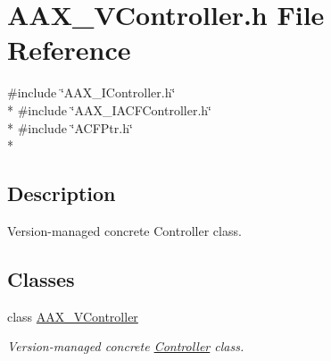 \hypertarget{a00304}{}\section{A\+A\+X\+\_\+\+V\+Controller.\+h File Reference}
\label{a00304}
{\ttfamily \#include \char`\"{}A\+A\+X\+\_\+\+I\+Controller.\+h\char`\"{}}\\*
{\ttfamily \#include \char`\"{}A\+A\+X\+\_\+\+I\+A\+C\+F\+Controller.\+h\char`\"{}}\\*
{\ttfamily \#include \char`\"{}A\+C\+F\+Ptr.\+h\char`\"{}}\\*


\subsection{Description}
Version-\/managed concrete Controller class. 

\subsection*{Classes}
\begin{DoxyCompactItemize}
\item 
class \hyperlink{a00132}{A\+A\+X\+\_\+\+V\+Controller}
\begin{DoxyCompactList}\small\item\em Version-\/managed concrete \hyperlink{a00090}{Controller} class. \end{DoxyCompactList}\end{DoxyCompactItemize}
